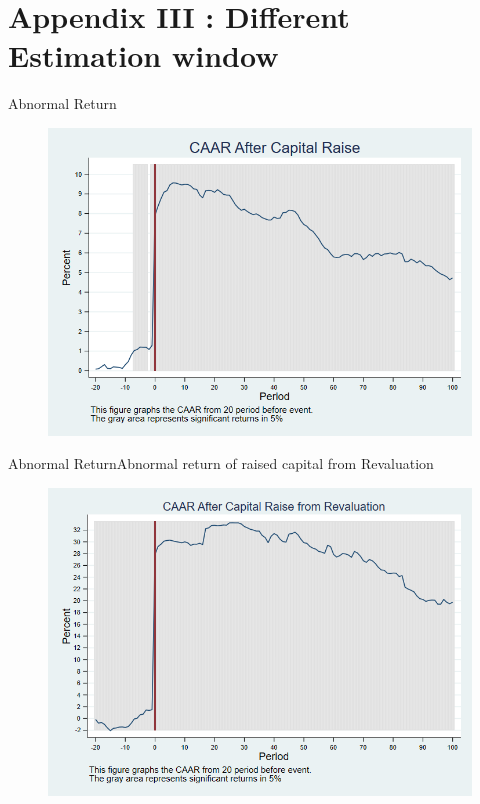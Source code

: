 \documentclass{beamer}
\begin{document}
\section{Appendix III : Different Estimation window}
\begin{frame}{Abnormal Return}
	\label{car_abnormalreturn2}
	\begin{figure}
		\centering
		\includegraphics[width=0.7\linewidth]{Output/car_abnormalreturn2.png}
		\label{fig:car_abnormalreturn2}
	\end{figure}
\end{frame}

\begin{frame}{Abnormal Return}{Abnormal return of raised capital from Revaluation}
	\label{car_abnormalreturn2Revaluation}
	\begin{figure}
		\centering
		\includegraphics[width=0.65\linewidth]{Output/car_abnormalreturn2Revaluation.png}
		\label{fig:car_abnormalreturn2Revaluation}
	\end{figure}
\end{frame}
\end{document}
